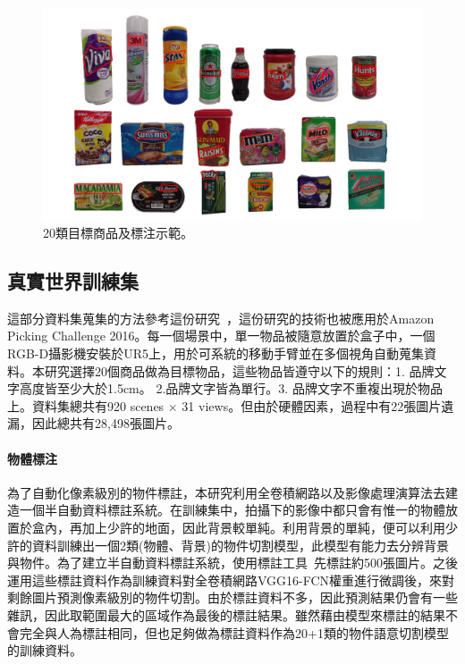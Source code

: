 \begin{figure}[ht]
	\centering
	\includegraphics[height=!, width=1.0\linewidth, keepaspectratio=true]
	{./figures/20_products.jpg}
  \caption{20類目標商品及標注示範。}
  \label{figure:20_products}
\end{figure}

\subsection{真實世界訓練集}
這部分資料集蒐集的方法參考這份研究~\cite{zeng2016multi}，這份研究的技術也被應用於Amazon Picking Challenge 2016。每一個場景中，單一物品被隨意放置於盒子中，一個RGB-D攝影機安裝於UR5上，用於可系統的移動手臂並在多個視角自動蒐集資料。本研究選擇20個商品做為目標物品，這些物品皆遵守以下的規則：1. 品牌文字高度皆至少大於1.5cm。 2.品牌文字皆為單行。3. 品牌文字不重複出現於物品上。資料集總共有920 scenes $\times$ 31 views。但由於硬體因素，過程中有22張圖片遺漏，因此總共有28,498張圖片。

\paragraph{物體標注}
為了自動化像素級別的物件標註，本研究利用全卷積網路以及影像處理演算法去建造一個半自動資料標註系統。在訓練集中，拍攝下的影像中都只會有惟一的物體放置於盒內，再加上少許的地面，因此背景較單純。利用背景的單純，便可以利用少許的資料訓練出一個2類(物體、背景)的物件切割模型，此模型有能力去分辨背景與物件。為了建立半自動資料標註系統，使用標註工具~\cite{russell2008labelme}先標註約500張圖片。之後運用這些標註資料作為訓練資料對全卷積網路VGG16-FCN權重進行微調後，來對剩餘圖片預測像素級別的物件切割。由於標註資料不多，因此預測結果仍會有一些雜訊，因此取範圍最大的區域作為最後的標註結果。雖然藉由模型來標註的結果不會完全與人為標註相同，但也足夠做為標註資料作為20+1類的物件語意切割模型的訓練資料。

